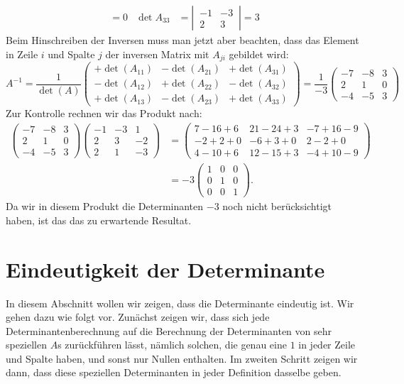 \begin{beispiel}
\begin{align*}
=0
&
\det A_{33}&=\left|\,\begin{matrix}-1&-3\\ 2& 3\end{matrix}\,\right|
=3
\end{align*}
Beim Hinschreiben der Inversen muss man jetzt aber beachten,
dass das Element in Zeile $i$ und Spalte $j$ der inversen Matrix
mit $A_{ji}$ gebildet wird:
\[
A^{-1}=\frac1{\det(A)}\begin{pmatrix}
+\det(A_{11})&-\det(A_{21})&+\det(A_{31})\\
-\det(A_{12})&+\det(A_{22})&-\det(A_{32})\\
+\det(A_{13})&-\det(A_{23})&+\det(A_{33})
\end{pmatrix}
=\frac1{-3}\begin{pmatrix}
-7&-8& 3\\
 2& 1& 0\\
-4&-5& 3
\end{pmatrix}
\]
Zur Kontrolle rechnen wir das Produkt nach:
\begin{align*}
\begin{pmatrix}
-7&-8& 3\\
 2& 1& 0\\
-4&-5& 3
\end{pmatrix}
\begin{pmatrix}
-1&-3& 1\\
 2& 3&-2\\
 2& 1&-3
\end{pmatrix}
&=
\begin{pmatrix}
 7-16+6&21-24+3&-7+16-9\\
-2+ 2+0&-6+ 3+0& 2- 2+0\\
 4-10+6&12-15+3&-4+10-9
\end{pmatrix}
\\
&=-3\begin{pmatrix}
1&0&0\\
0&1&0\\
0&0&1
\end{pmatrix}.
\end{align*}
Da wir in diesem Produkt die Determinanten $-3$ noch nicht berücksichtigt
haben, ist das das zu erwartende Resultat.
\end{beispiel}

\section{Eindeutigkeit der Determinante\label{deteindeutig}}
In diesem Abschnitt wollen wir zeigen, dass die Determinante
eindeutig ist.
Wir gehen dazu wie folgt vor.
Zunächst zeigen wir,
dass sich jede Determinantenberechnung auf die Berechnung der Determinanten
von sehr speziellen $A$s zurückführen lässt, nämlich solchen,
die genau eine $1$ in jeder Zeile und Spalte haben, und sonst nur
Nullen enthalten.
Im zweiten Schritt zeigen wir dann, dass diese
speziellen Determinanten in jeder Definition dasselbe geben.

